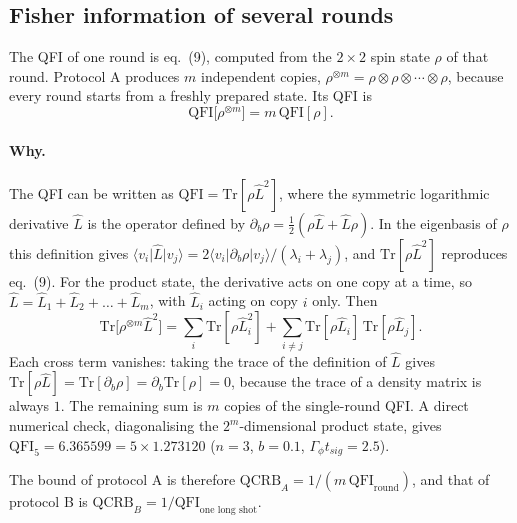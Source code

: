 \subsection{Fisher information of several rounds}
\label{sec:rep-additive}

The QFI of one round is eq.~(9), computed from the $2\times2$ spin state $\rho$ of that round. Protocol A produces $m$ independent copies, $\rho^{\otimes m} = \rho\otimes\rho\otimes\cdots\otimes\rho$, because every round starts from a freshly prepared state. Its QFI is
\begin{equation}
\label{eq:R-additive}
    \mathrm{QFI}\big[\rho^{\otimes m}\big] = m\,\mathrm{QFI}[\rho].
\end{equation}

\paragraph{Why.} The QFI can be written as $\mathrm{QFI} = \mathrm{Tr}[\rho\hat{L}^2]$, where the symmetric logarithmic derivative $\hat{L}$ is the operator defined by $\partial_b\rho = \tfrac{1}{2}(\rho\hat{L} + \hat{L}\rho)$. In the eigenbasis of $\rho$ this definition gives $\langle v_i\vert\hat{L}\vert v_j\rangle = 2\langle v_i\vert\partial_b\rho\vert v_j\rangle/(\lambda_i + \lambda_j)$, and $\mathrm{Tr}[\rho\hat{L}^2]$ reproduces eq.~(9). For the product state, the derivative acts on one copy at a time, so $\hat{L} = \hat{L}_1 + \hat{L}_2 + \dots + \hat{L}_m$, with $\hat{L}_i$ acting on copy $i$ only. Then
\begin{equation*}
    \mathrm{Tr}\big[\rho^{\otimes m}\hat{L}^2\big] = \sum_i \mathrm{Tr}[\rho\hat{L}_i^2] + \sum_{i\neq j}\mathrm{Tr}[\rho\hat{L}_i]\,\mathrm{Tr}[\rho\hat{L}_j].
\end{equation*}
Each cross term vanishes: taking the trace of the definition of $\hat{L}$ gives $\mathrm{Tr}[\rho\hat{L}] = \mathrm{Tr}[\partial_b\rho] = \partial_b\mathrm{Tr}[\rho] = 0$, because the trace of a density matrix is always $1$. The remaining sum is $m$ copies of the single-round QFI. A direct numerical check, diagonalising the $2^m$-dimensional product state, gives $\mathrm{QFI}_5 = 6.365599 = 5\times1.273120$ ($n = 3$, $b = 0.1$, $\Gamma_\phi t_{sig} = 2.5$).

The bound of protocol A is therefore $\mathrm{QCRB}_A = 1/(m\,\mathrm{QFI}_{\text{round}})$, and that of protocol B is $\mathrm{QCRB}_B = 1/\mathrm{QFI}_{\text{one long shot}}$.

